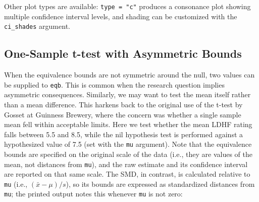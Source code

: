 \documentclass[]{interact}
\theoremstyle{plain}%
\theoremstyle{definition}
\theoremstyle{remark}
\newenvironment{Shaded}{\begin{snugshade}}{\end{snugshade}}
\newcommand{\AttributeTok}[1]{\textcolor[rgb]{0.13,0.29,0.53}{#1}}
\newcommand{\CommentTok}[1]{\textcolor[rgb]{0.56,0.35,0.01}{\textit{#1}}}
\newcommand{\FloatTok}[1]{\textcolor[rgb]{0.00,0.00,0.81}{#1}}
\newcommand{\FunctionTok}[1]{\textcolor[rgb]{0.13,0.29,0.53}{\textbf{#1}}}
\newcommand{\NormalTok}[1]{#1}
\newcommand{\OtherTok}[1]{\textcolor[rgb]{0.56,0.35,0.01}{#1}}
\newcommand{\SpecialCharTok}[1]{\textcolor[rgb]{0.81,0.36,0.00}{\textbf{#1}}}
\begin{document}
Other plot types are available: \texttt{type\ =\ "c"} produces a
consonance plot showing multiple confidence interval levels, and shading
can be customized with the \texttt{ci\_shades} argument.

\subsection{One-Sample t-test with Asymmetric
Bounds}\label{one-sample-t-test-with-asymmetric-bounds}

When the equivalence bounds are not symmetric around the null, two
values can be supplied to \texttt{eqb}. This is common when the research
question implies asymmetric consequences. Similarly, we may want to test
the mean itself rather than a mean difference. This harkens back to the
original use of the t-test by Gosset at Guinness Brewery, where the
concern was whether a single sample mean fell within acceptable limits.
Here we test whether the mean LDHF rating falls between 5.5 and 8.5,
while the nil hypothesis test is performed against a hypothesized value
of 7.5 (set with the \texttt{mu} argument). Note that the equivalence
bounds are specified on the original scale of the data (i.e., they are
values of the mean, not distances from \texttt{mu}), and the raw
estimate and its confidence interval are reported on that same scale.
The SMD, in contrast, is calculated relative to \texttt{mu} (i.e.,
\((\bar{x} - \mu)/s\)), so its bounds are expressed as standardized
distances from \texttt{mu}; the printed output notes this whenever
\texttt{mu} is not zero:

\begin{Shaded}
\end{Shaded}
\end{document}
